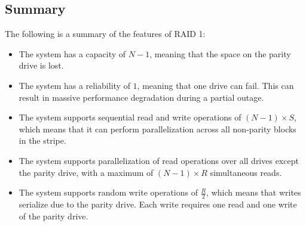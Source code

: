 \subsection{Summary}
The following is a summary of the features of RAID 1:
\begin{itemize}
    \item The system has a capacity of $N-1$, meaning that the space on the parity drive is lost. 
    \item The system has a reliability of $1$, meaning that one drive can fail. 
        This can result in massive performance degradation during a partial outage.
    \item The system supports sequential read and write operations of $(N-1)\times S$, which means that it can perform parallelization across all non-parity blocks in the stripe.
    \item The system supports parallelization of read operations over all drives except the parity drive, with a maximum of $(N-1)\times R$ simultaneous reads.
    \item The system supports random write operations of $\frac{R}{2}$, which means that writes serialize due to the parity drive. 
        Each write requires one read and one write of the parity drive.
\end{itemize}